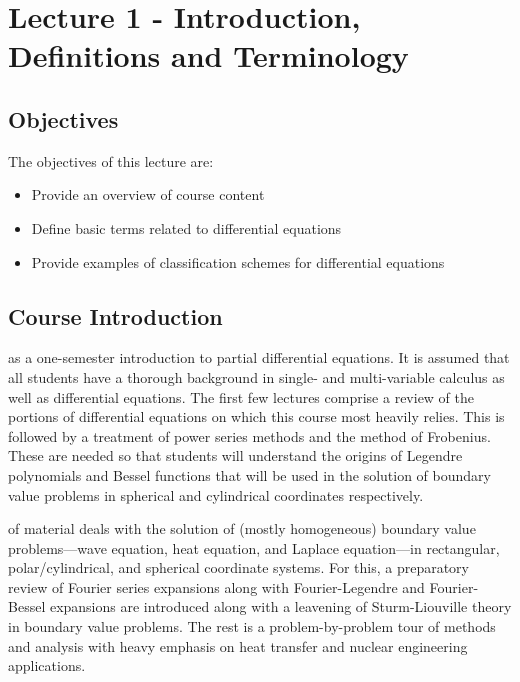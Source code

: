 \chapter{Lecture 1 - Introduction, Definitions and Terminology}
\label{ch:lec1}%
\section{Objectives}
The objectives of this lecture are:
\begin{itemize}
\item Provide an overview of course content
\item Define basic terms related to differential equations
\item Provide examples of classification schemes for differential equations
\end{itemize}

\section{Course Introduction}
 as a one-semester introduction to partial differential equations.  It is assumed that all students have a thorough background in single- and multi-variable calculus as well as differential equations.  The first few lectures comprise a review of the portions of differential equations on which this course most heavily relies.  This is followed by a treatment of power series methods and the method of Frobenius.  These are needed so that students will understand the origins of Legendre polynomials and Bessel functions that will be used in the solution of boundary value problems in spherical and cylindrical coordinates respectively.

 of material deals with the solution of (mostly homogeneous) boundary value problems---wave equation, heat equation, and Laplace equation---in rectangular, polar/cylindrical, and spherical coordinate systems.  For this, a preparatory review of Fourier series expansions along with Fourier-Legendre and Fourier-Bessel expansions are introduced along with a leavening of Sturm-Liouville theory in boundary value problems.  The rest is a problem-by-problem tour of methods and analysis with heavy emphasis on heat transfer and nuclear engineering applications.

